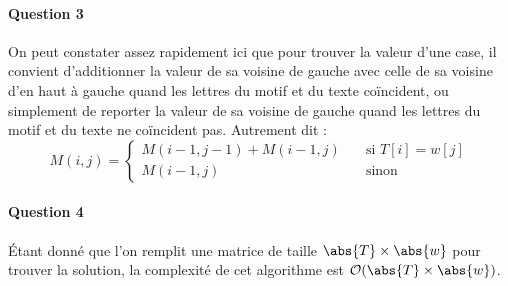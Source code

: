 \documentclass[a4paper,11pt]{article}
\begin{document}
  \paragraph{Question 3} On peut constater assez rapidement ici que pour trouver
  la valeur d'une case, il convient d'additionner la valeur de sa voisine
  de gauche avec celle de sa voisine d'en haut à gauche quand les lettres du
  motif et du texte coïncident, ou simplement de reporter la valeur de sa
  voisine de gauche quand les lettres du motif et du texte ne coïncident pas.
  Autrement dit :
  \[
  M(i, j) =
  \begin{cases}
    M(i - 1, j - 1) + M(i - 1, j) & \quad \text{si }T[i]=w[j]\\
    M(i - 1, j)                   & \quad \text{sinon}
  \end{cases}
  \]
  \paragraph{Question 4} Étant donné que l'on remplit une matrice  de taille
  $\abs{T} \times \abs{w}$ pour trouver la solution, la complexité de cet
  algorithme est $\mathcal{O}(\abs{T} \times \abs{w})$.
\end{document}
